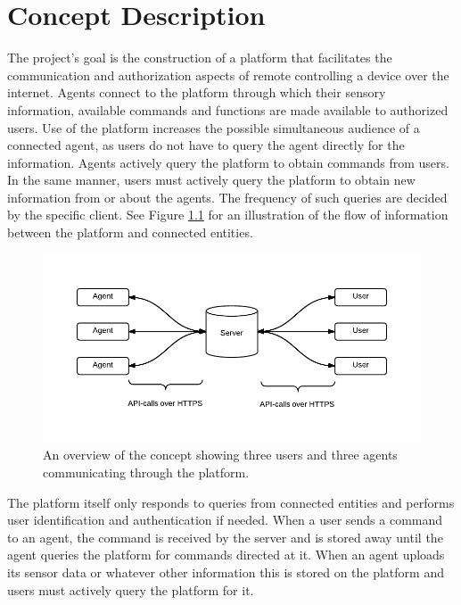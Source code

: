 \chapter{Concept Description}
The project's goal is the construction of a platform that facilitates the communication and authorization aspects of remote controlling a device over the internet.
Agents connect to the platform through which their sensory information, available commands and functions are made available to authorized users.
Use of the platform increases the possible simultaneous audience of a connected agent, as users do not have to query the agent directly for the information. 
Agents actively query the platform to obtain commands from users.
In the same manner, users must actively query the platform to obtain new information from or about the agents.
The frequency of such queries are decided by the specific client.
See Figure \ref{fig:system-overview} for an illustration of the flow of information between the platform and connected entities.

\begin{figure}[H]
\begin{center}
	\includegraphics{graphics/system-overview.pdf}
	\caption{An overview of the concept showing three users and three agents communicating through the platform.}
	\label{fig:system-overview}
\end{center}
\end{figure}

The platform itself only responds to queries from connected entities and performs user identification and authentication if needed.
When a user sends a command to an agent, the command is received by the server and is stored away until the agent queries the platform for commands directed at it.
When an agent uploads its sensor data or whatever other information this is stored on the platform and users must actively query the platform for it.

